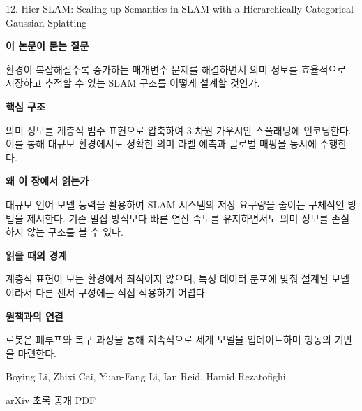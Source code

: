 \documentclass[11pt,openany]{book}
\begin{document}
\begin{termcard}{12. Hier-SLAM: Scaling-up Semantics in SLAM with a Hierarchically Categorical Gaussian Splatting}

\par

\medskip

{\sffamily\bfseries\color{deepblue} 이 논문이 묻는 질문}\par

환경이 복잡해질수록 증가하는 매개변수 문제를 해결하면서 의미 정보를 효율적으로 저장하고 추적할 수 있는 SLAM 구조를 어떻게 설계할 것인가.

\smallskip

{\sffamily\bfseries\color{deepblue} 핵심 구조}\par

의미 정보를 계층적 범주 표현으로 압축하여 3 차원 가우시안 스플래팅에 인코딩한다. 이를 통해 대규모 환경에서도 정확한 의미 라벨 예측과 글로벌 매핑을 동시에 수행한다.

\smallskip

{\sffamily\bfseries\color{deepblue} 왜 이 장에서 읽는가}\par

대규모 언어 모델 능력을 활용하여 SLAM 시스템의 저장 요구량을 줄이는 구체적인 방법을 제시한다. 기존 밀집 방식보다 빠른 연산 속도를 유지하면서도 의미 정보를 손실하지 않는 구조를 볼 수 있다.

\smallskip

{\sffamily\bfseries\color{coral} 읽을 때의 경계}\par

계층적 표현이 모든 환경에서 최적이지 않으며, 특정 데이터 분포에 맞춰 설계된 모델이라서 다른 센서 구성에는 직접 적용하기 어렵다.

\smallskip

{\sffamily\bfseries\color{teal} 원책과의 연결}\par

로봇은 폐루프와 복구 과정을 통해 지속적으로 세계 모델을 업데이트하며 행동의 기반을 마련한다.

\medskip

{\footnotesize\color{muted} Boying Li, Zhixi Cai, Yuan-Fang Li, Ian Reid, Hamid Rezatofighi\par

\href{https://arxiv.org/abs/2409.12518}{arXiv 초록} \quad \href{https://arxiv.org/pdf/2409.12518}{공개 PDF}\par}

\end{termcard}
\end{document}
